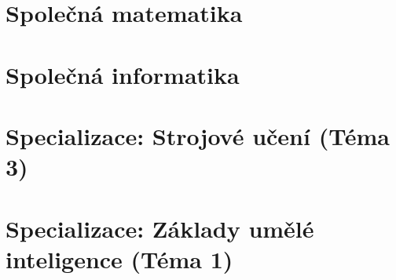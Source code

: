 \documentclass[11pt]{article}
\begin{document}
\tableofcontents
\bigskip

\section{Společná matematika}









\section{Společná informatika}











\section{Specializace: Strojové učení (Téma 3)}












\section{Specializace: Základy umělé inteligence (Téma 1)}









\end{document}
